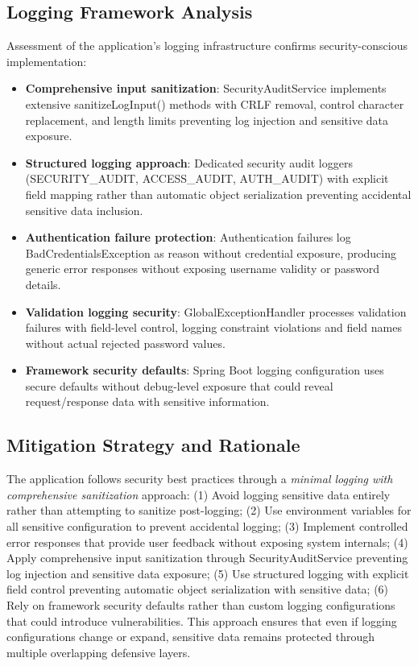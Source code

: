 \documentclass[]{UCD_CS_FYP_Report}
\begin{document}
\subsection*{Logging Framework Analysis}
Assessment of the application's logging infrastructure confirms security-conscious implementation:
\begin{itemize}
	\item \textbf{Comprehensive input sanitization}: SecurityAuditService implements extensive sanitizeLogInput() methods with CRLF removal, control character replacement, and length limits preventing log injection and sensitive data exposure.
	\item \textbf{Structured logging approach}: Dedicated security audit loggers (SECURITY\_AUDIT, ACCESS\_AUDIT, AUTH\_AUDIT) with explicit field mapping rather than automatic object serialization preventing accidental sensitive data inclusion.
	\item \textbf{Authentication failure protection}: Authentication failures log BadCredentialsException as reason without credential exposure, producing generic error responses without exposing username validity or password details.
	\item \textbf{Validation logging security}: GlobalExceptionHandler processes validation failures with field-level control, logging constraint violations and field names without actual rejected password values.
	\item \textbf{Framework security defaults}: Spring Boot logging configuration uses secure defaults without debug-level exposure that could reveal request/response data with sensitive information.
\end{itemize}

\subsection*{Mitigation Strategy and Rationale}
The application follows security best practices through a \textit{minimal logging with comprehensive sanitization} approach: (1) Avoid logging sensitive data entirely rather than attempting to sanitize post-logging; (2) Use environment variables for all sensitive configuration to prevent accidental logging; (3) Implement controlled error responses that provide user feedback without exposing system internals; (4) Apply comprehensive input sanitization through SecurityAuditService preventing log injection and sensitive data exposure; (5) Use structured logging with explicit field control preventing automatic object serialization with sensitive data; (6) Rely on framework security defaults rather than custom logging configurations that could introduce vulnerabilities. This approach ensures that even if logging configurations change or expand, sensitive data remains protected through multiple overlapping defensive layers.
\end{document}
